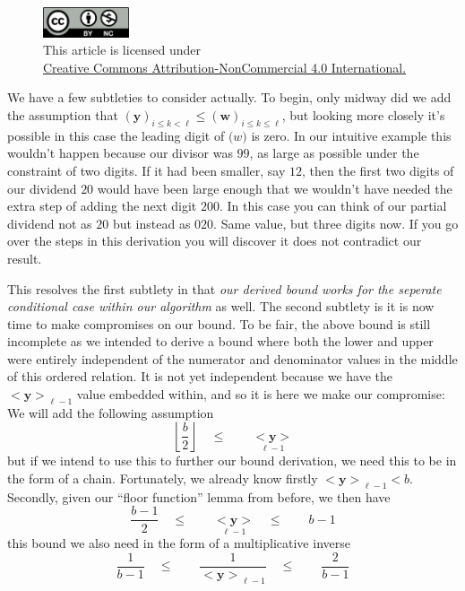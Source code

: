 \documentclass[twoside]{article}
\renewcommand{\leq}{\ensuremath{\quad\le\qquad}}
\newcommand{\bseq}[1][u]{\ensuremath{<\!\!\bm{#1}\!\!>}}
\newcommand{\bunderseq}[2][u]{\ensuremath{\underset{#2}{<\!\!\bm{#1}\!\!>}}}
\newcommand{\numer}[3][w]{\ensuremath{(\bm{#1})_{#2\le k\le #3}}}
\newcommand{\denom}[3][y]{\ensuremath{(\bm{#1})_{#2\le k <  #3}}}
\begin{document}
\begin{figure}[h]
\centering
\includegraphics[width=1in]{../../../cc-by-nc.png}\\[0.1in]
\tiny This article is licensed under \\
\href{http://creativecommons.org/licenses/by-nc/4.0/}
{Creative Commons Attribution-NonCommercial 4.0 International.}\\[0.3in]
\end{figure}

We have a few subtleties to consider actually. To begin, only midway did we add the assumption that
$ \denom{i}{\ell}\le\numer{i}{\ell} $, but looking more closely it's possible in this case the leading digit of $ \bm(w) $ is zero.
In our intuitive example this wouldn't happen because our divisor was $ 99 $, as large as possible under the constraint of two digits.
If it had been smaller, say $ 12 $, then the first two digits of our dividend $ 20 $ would have been large enough that we wouldn't
have needed the extra step of adding the next digit $ 200 $. In this case you can think of our partial dividend not as $ 20 $ but
instead as $ 020 $. Same value, but three digits now. If you go over the steps in this derivation you will discover it does not
contradict our result.

This resolves the first subtlety in that \emph{our derived bound works for the seperate conditional case within our algorithm} as well.
The second subtlety is it is now time to make compromises on our bound. To be fair, the above bound is still incomplete as we intended
to derive a bound where both the lower and upper were entirely independent of the numerator and denominator values in the middle of
this ordered relation. It is not yet independent because we have the $ \bseq[y]_{\ell-1} $ value embedded within, and so it is here
we make our compromise: We will add the following assumption
$$ \left\lfloor\frac{b}{2}\right\rfloor\leq\bunderseq[y]{\ell-1} $$
but if we intend to use this to further our bound derivation, we need this to be in the form of a chain. Fortunately, we already
know firstly $ \bseq[y]_{\ell-1} < b $. Secondly, given our ``floor function'' lemma from before, we then have
$$ \frac{b-1}{2}\leq\bunderseq[y]{\ell-1}\leq b-1 $$
this bound we also need in the form of a multiplicative inverse
$$ \frac{1}{b-1}\leq\frac{1}{\bseq[y]_{\ell-1}}\leq\frac{2}{b-1} $$
\end{document}

